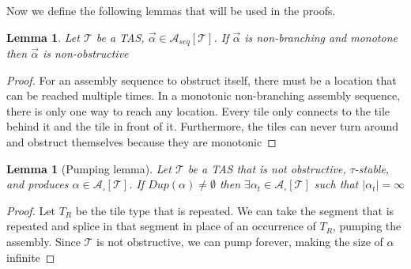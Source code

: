 \documentclass[12pt]{article}
\newtheorem{lemma}[theorem]{Lemma}
\newcommand{\tTerm}{\mathcal{A}_\square[\mathcal{T}]}
\newcommand{\tSeq}{\mathcal{A}_{seq}[\mathcal{T}]}
\newcommand{\aSeq}{\overrightarrow{\alpha}}
\begin{document}
Now we define the following lemmas that will be used in the proofs.

%

\begin{lemma}
    Let $\mathcal{T}$ be a TAS, $\aSeq \in \tSeq$.
    If $\aSeq$ is non-branching and monotone then $\aSeq$ is non-obstructive
\end{lemma}

\begin{proof}
    For an assembly sequence to obstruct itself, there must be a location that can be reached multiple times. In a monotonic non-branching assembly sequence, there is only one way to reach any location. Every tile only connects to the tile behind it and the tile in front of it. Furthermore, the tiles can never turn around and obstruct themselves because they are monotonic
\end{proof}


\begin{lemma}[Pumping lemma]
    Let $\mathcal{T}$ be a TAS that is not obstructive, $\tau$-stable, and produces $\alpha \in \tTerm$. If $Dup(\alpha) \ne \emptyset$ then $\exists \alpha_t \in \tTerm$ such that $|\alpha_t| = \infty$
\end{lemma}
\begin{proof}
    Let $T_R$ be the tile type that is repeated. We can take the segment that is repeated and splice in that segment in place of an occurrence of $T_R$, pumping the assembly. Since $\mathcal{T}$ is not obstructive, we can pump forever, making the size of $\alpha$ infinite 
\end{proof}


%
%
%
\end{document}
